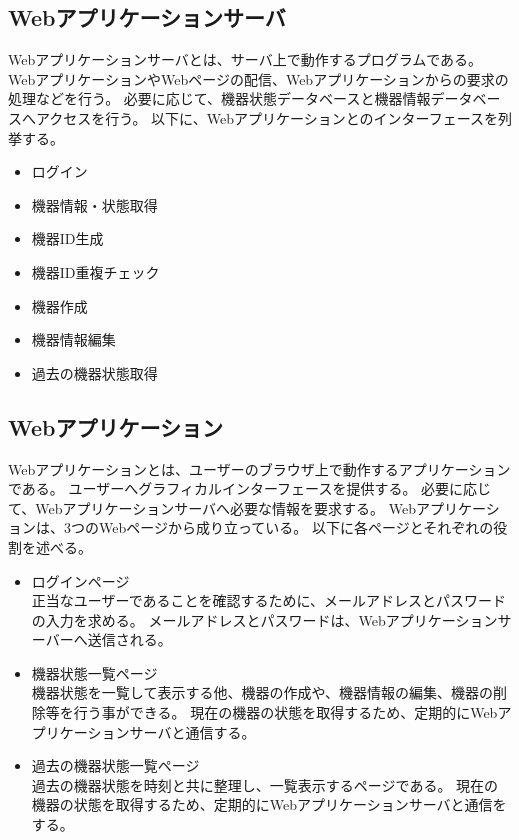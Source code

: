\subsection{Webアプリケーションサーバ}
Webアプリケーションサーバとは、サーバ上で動作するプログラムである。
WebアプリケーションやWebページの配信、Webアプリケーションからの要求の処理などを行う。
必要に応じて、機器状態データベースと機器情報データベースへアクセスを行う。
以下に、Webアプリケーションとのインターフェースを列挙する。
\begin{itemize}
	\item ログイン
	\item 機器情報・状態取得
	\item 機器ID生成
	\item 機器ID重複チェック
	\item 機器作成
	\item 機器情報編集
	\item 過去の機器状態取得
\end{itemize}


\subsection{Webアプリケーション}
Webアプリケーションとは、ユーザーのブラウザ上で動作するアプリケーションである。
ユーザーへグラフィカルインターフェースを提供する。
必要に応じて、Webアプリケーションサーバへ必要な情報を要求する。
Webアプリケーションは、3つのWebページから成り立っている。
以下に各ページとそれぞれの役割を述べる。
\begin{itemize}
	\item ログインページ\\
		正当なユーザーであることを確認するために、メールアドレスとパスワードの入力を求める。
		メールアドレスとパスワードは、Webアプリケーションサーバーへ送信される。
	\item 機器状態一覧ページ\\
		機器状態を一覧して表示する他、機器の作成や、機器情報の編集、機器の削除等を行う事ができる。
		現在の機器の状態を取得するため、定期的にWebアプリケーションサーバと通信する。
	\item 過去の機器状態一覧ページ\\
		過去の機器状態を時刻と共に整理し、一覧表示するページである。
		現在の機器の状態を取得するため、定期的にWebアプリケーションサーバと通信をする。
\end{itemize}

